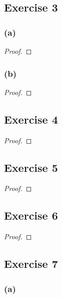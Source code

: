 \documentclass[14pt]{extarticle}
\begin{document}
\subsection{Exercise 3}

\subsubsection{(a)}

\begin{proof}

\end{proof}

\subsubsection{(b)}

\begin{proof}

\end{proof}

\subsection{Exercise 4}

\begin{proof}

\end{proof}

\subsection{Exercise 5}

\begin{proof}

\end{proof}

\subsection{Exercise 6}

\begin{proof}

\end{proof}

\subsection{Exercise 7}

\subsubsection{(a)}
\end{document}
